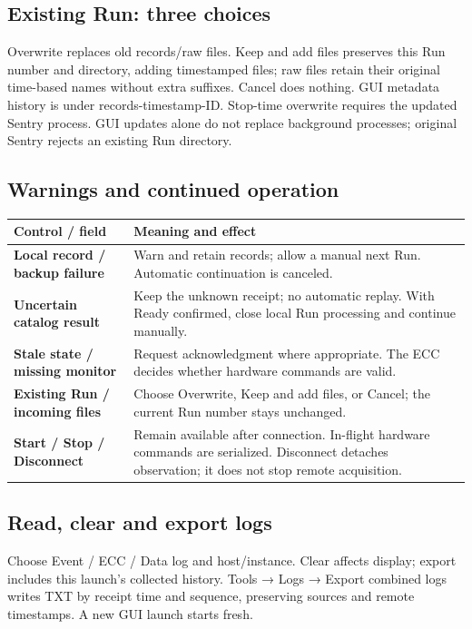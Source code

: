 \documentclass[11pt,a4paper]{article}
\newcommand{\ui}[1]{\textbf{#1}}
\begin{document}
\subsection*{Existing Run: three choices}
Overwrite replaces old records/raw files. Keep and add files preserves this Run number and directory, adding timestamped files; raw files retain their original time-based names without extra suffixes. Cancel does nothing. GUI metadata history is under records-timestamp-ID. Stop-time overwrite requires the updated Sentry process. GUI updates alone do not replace background processes; original Sentry rejects an existing Run directory.
\subsection*{Warnings and continued operation}
\begin{tabularx}{\linewidth}{@{}L{58mm}Y@{}}\toprule
Control / field & Meaning and effect \\\midrule
\ui{Local record / backup failure} & Warn and retain records; allow a manual next Run. Automatic continuation is canceled.\\
\ui{Uncertain catalog result} & Keep the unknown receipt; no automatic replay. With Ready confirmed, close local Run processing and continue manually.\\
\ui{Stale state / missing monitor} & Request acknowledgment where appropriate. The ECC decides whether hardware commands are valid.\\
\ui{Existing Run / incoming files} & Choose Overwrite, Keep and add files, or Cancel; the current Run number stays unchanged.\\
\ui{Start / Stop / Disconnect} & Remain available after connection. In-flight hardware commands are serialized. Disconnect detaches observation; it does not stop remote acquisition.\\
\bottomrule\end{tabularx}
\subsection*{Read, clear and export logs}
Choose Event / ECC / Data log and host/instance. Clear affects display; export includes this launch’s collected history. Tools → Logs → Export combined logs writes TXT by receipt time and sequence, preserving sources and remote timestamps. A new GUI launch starts fresh.
\end{document}
